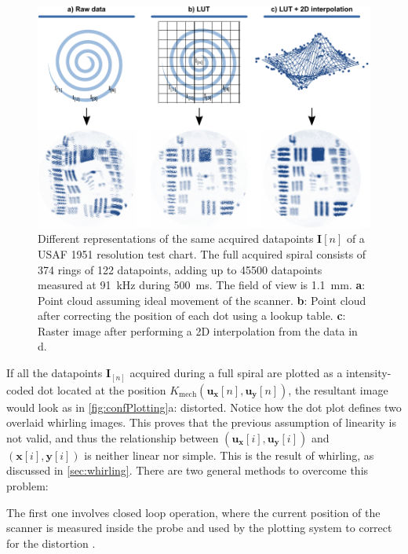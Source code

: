 \documentclass[10pt]{iopart}
\begin{document}
\begin{figure}[h!]\centering \includegraphics[width=\columnwidth]{figures/Plotting.pdf}
      \caption{Different representations of the same acquired datapoints $\mathbf{I}[n]$ of a USAF 1951 resolution test chart. The full acquired spiral consists of 374 rings of 122 datapoints, adding up to 45500 datapoints measured at \SI{91}{\kilo\hertz} during \SI{500}{\milli\second}. The field of view is \SI{1.1}{\milli\meter}.
      \textbf{a}: Point cloud assuming ideal movement of the scanner.
      \textbf{b}: Point cloud after correcting the position of each dot using a lookup table.
      \textbf{c}: Raster image after performing a 2D interpolation from the data in d.}
      \label{fig:confPlotting}
\end{figure}

If all the datapoints $\mathbf{I}_{[n]}$ acquired during a full spiral are plotted as a intensity-coded dot located at the position $K_\mathrm{mech}(\mathbf{u_x}[n], \mathbf{u_y}[n])$, the resultant image would look as in \autoref{fig:confPlotting}a: distorted. Notice how the dot plot defines two overlaid whirling images. This proves that the previous assumption of linearity is not valid, and thus the relationship between $(\mathbf{u_x}[i], \mathbf{u_y}[i])$ and $(\mathbf{x}[i], \mathbf{y}[i])$ is neither linear nor simple. This is the result of whirling, as discussed in \autoref{sec:whirling}. There are two general methods to overcome this problem:

The first one involves closed loop operation, where the current position of the scanner is measured inside the probe and used by the plotting system to correct for the distortion \cite{Yeoh2014}. 
\end{document}
